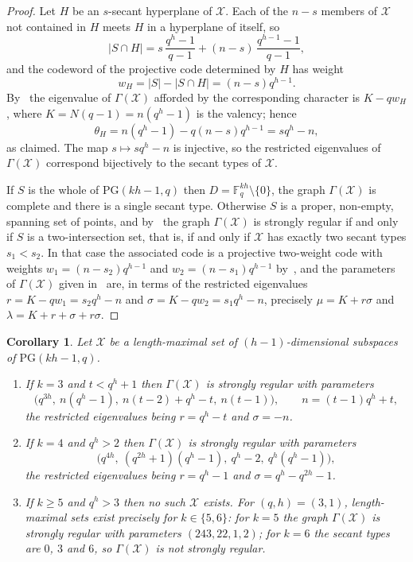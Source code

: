 \documentclass[12pt, twoside]{article}
\newtheorem{cor}[theorem]{\bf Corollary}
\begin{document}
	\begin{proof}
		Let $H$ be an $s$-secant hyperplane of $\mathcal{X}$. Each of the $n-s$ members of $\mathcal{X}$ not contained in $H$ meets $H$ in a hyperplane of itself, so
		$$
		|S\cap H|=s\,\frac{q^h-1}{q-1}+(n-s)\,\frac{q^{h-1}-1}{q-1},
		$$
		and the codeword of the projective code determined by $H$ has weight
		$$
		w_H=|S|-|S\cap H|=(n-s)q^{h-1}.
		$$
		By~\cite[Lemma~3.4]{CK} the eigenvalue of $\Gamma(\mathcal{X})$ afforded by the corresponding character is $K-qw_H$, where $K=N(q-1)=n(q^h-1)$ is the valency; hence
		$$
		\theta_H=n(q^h-1)-q(n-s)q^{h-1}=sq^h-n,
		$$
		as claimed. The map $s\mapsto sq^h-n$ is injective, so the restricted eigenvalues of $\Gamma(\mathcal{X})$ correspond bijectively to the secant types of $\mathcal{X}$.

		If $S$ is the whole of $\mathrm{PG}(kh-1,q)$ then $D=\mathbb{F}_q^{kh}\setminus\{0\}$, the graph $\Gamma(\mathcal{X})$ is complete and there is a single secant type. Otherwise $S$ is a proper, non-empty, spanning set of points, and by~\cite[Theorem~3.2]{CK} the graph $\Gamma(\mathcal{X})$ is strongly regular if and only if $S$ is a two-intersection set, that is, if and only if $\mathcal{X}$ has exactly two secant types $s_1<s_2$. In that case the associated code is a projective two-weight code with weights $w_1=(n-s_2)q^{h-1}$ and $w_2=(n-s_1)q^{h-1}$ by~\cite[Theorem~3.1]{CK}, and the parameters of $\Gamma(\mathcal{X})$ given in~\cite[Corollary~3.7]{CK} are, in terms of the restricted eigenvalues $r=K-qw_1=s_2q^h-n$ and $\sigma=K-qw_2=s_1q^h-n$, precisely $\mu=K+r\sigma$ and $\lambda=K+r+\sigma+r\sigma$.
	\end{proof}

	\begin{cor}\label{cor: srg list}
		Let $\mathcal{X}$ be a length-maximal set of $(h-1)$-dimensional subspaces of $\mathrm{PG}(kh-1,q)$.
		\begin{enumerate}
			\item If $k=3$ and $t<q^h+1$ then $\Gamma(\mathcal{X})$ is strongly regular with parameters
			$$
			\bigl(q^{3h},\ n(q^h-1),\ n(t-2)+q^h-t,\ n(t-1)\bigr),\qquad n=(t-1)q^h+t,
			$$
			the restricted eigenvalues being $r=q^h-t$ and $\sigma=-n$. \label{part: srg k=3}

			\item If $k=4$ and $q^h>2$ then $\Gamma(\mathcal{X})$ is strongly regular with parameters
			$$
			\bigl(q^{4h},\ (q^{2h}+1)(q^h-1),\ q^h-2,\ q^h(q^h-1)\bigr),
			$$
			the restricted eigenvalues being $r=q^h-1$ and $\sigma=q^h-q^{2h}-1$. \label{part: srg k=4}

			\item If $k\ge5$ and $q^h>3$ then no such $\mathcal{X}$ exists. For $(q,h)=(3,1)$, length-maximal sets exist precisely for $k\in\{5,6\}$: for $k=5$ the graph $\Gamma(\mathcal{X})$ is strongly regular with parameters $(243,22,1,2)$; for $k=6$ the secant types are $0$, $3$ and $6$, so $\Gamma(\mathcal{X})$ is not strongly regular. \label{part: srg k>=5}
		\end{enumerate}
	\end{cor}
\end{document}
